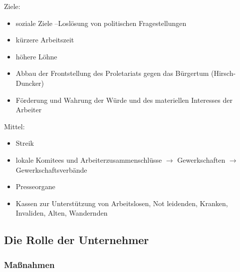 Ziele:

\begin{itemize}
\item soziale Ziele --Loslösung von politischen Fragestellungen
\item kürzere Arbeitszeit
\item höhere Löhne
\item Abbau der Frontstellung des Proletariats gegen das Bürgertum
(Hirsch-Duncker)
\item Förderung und Wahrung der Würde und des materiellen Interesses
der Arbeiter
\end{itemize}

Mittel:

\begin{itemize}
\item Streik
\item lokale Komitees und Arbeiterzusammenschlüsse $\longrightarrow$
Gewerkschaften $\longrightarrow$ Gewerkschaftsverbände
\item Presseorgane
\item Kassen zur Unterstützung von Arbeitslosen, Not leidenden,
Kranken, Invaliden, Alten, Wandernden
\end{itemize}

\newpage

\subsection{Die Rolle der Unternehmer}
\label{ssc:soz-frag-loes-unt}

\subsubsection{Maßnahmen}

\newlength{\frstcol}
\addtolength{\frstcol}{1ex}

\newlength{\sndthrdcol}
\newlength{\wholecols} %
\setlength{\wholecols}{\textwidth}
\addtolength{\wholecols}{-\frstcol}
\addtolength{\wholecols}{-5\tabcolsep}
\setlength{\sndthrdcol}{0.5\wholecols}



\tablelasttail{\bottomrule}

